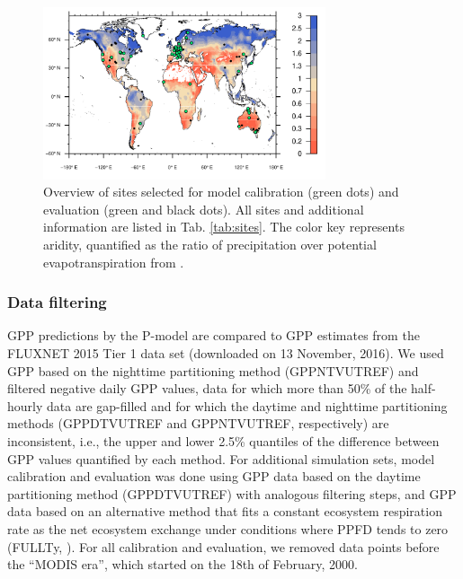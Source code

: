 \documentclass[gmd, manuscript]{copernicus}
\begin{document}
\begin{figure}[t]
    \centering
    \includegraphics[width=8.3cm]{fig/map_sites.pdf}
    \caption{Overview of sites selected for model calibration (green dots) and evaluation (green and black dots). All sites and additional information are listed in Tab. \ref{tab:sites}. The color key represents aridity, quantified as the ratio of precipitation over potential evapotranspiration from \citet{greve14}.}
    \label{fig:map_sites}
\end{figure}

\label{sec:sites}

\subsubsection{Data filtering}
\label{sec:datafiltering}
GPP predictions by the P-model are compared to GPP estimates from the FLUXNET 2015 Tier 1 data set (downloaded on 13 November, 2016). We used GPP based on the nighttime partitioning method \citep{Reichstein2005-mp} (GPP\textunderscore NT\textunderscore VUT\textunderscore REF) and filtered negative daily GPP values, data for which more than 50\% of the half-hourly data are gap-filled and for which the daytime and nighttime partitioning methods (GPP\textunderscore DT\textunderscore VUT\textunderscore REF and GPP\textunderscore NT\textunderscore VUT\textunderscore REF, respectively) are inconsistent, i.e., the upper and lower 2.5\% quantiles of the difference between GPP values quantified by each method. For additional simulation sets, model calibration and evaluation was done using GPP data based on the daytime partitioning method (GPP\textunderscore DT\textunderscore VUT\textunderscore REF) \citep{lasslop10} with analogous filtering steps, and GPP data based on an alternative method that fits a constant ecosystem respiration rate as the net ecosystem exchange under conditions where PPFD tends to zero (FULL\textunderscore Ty, \citet{wang17natpl}). For all calibration and evaluation, we removed data points before the ``MODIS era'', which started on the 18th of February, 2000.
\end{document}
